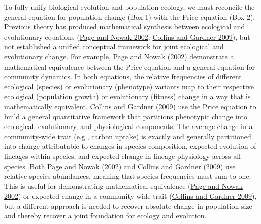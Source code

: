 \documentclass[
]{article}
\begin{document}
To fully unify biological evolution and population ecology, we must
reconcile the general equation for population change (Box 1) with the
Price equation (Box 2). Previous theory has produced mathematical
synthesis between ecological and evolutionary equations
(\protect\hyperlink{ref-Page2002}{Page and Nowak 2002};
\protect\hyperlink{ref-Collins2009}{Collins and Gardner 2009}), but not
established a unified conceptual framework for joint ecological and
evolutionary change. For example, Page and Nowak
(\protect\hyperlink{ref-Page2002}{2002}) demonstrate a mathematical
equivalence between the Price equation and a general equation for
community dynamics. In both equations, the relative frequencies of
different ecological (species) or evolutionary (phenotype) variants map
to their respective ecological (population growth) or evolutionary
(fitness) change in a way that is mathematically equivalent. Collins and
Gardner (\protect\hyperlink{ref-Collins2009}{2009}) use the Price
equation to build a general quantitative framework that partitions
phenotypic change into ecological, evolutionary, and physiological
components. The average change in a community-wide trait (e.g., carbon
uptake) is exactly and generally partitioned into change attributable to
changes in species composition, expected evolution of lineages within
species, and expected change in lineage physiology across all species.
Both Page and Nowak (\protect\hyperlink{ref-Page2002}{2002}) and Collins
and Gardner (\protect\hyperlink{ref-Collins2009}{2009}) use relative
species abundances, meaning that species frequencies must sum to one.
This is useful for demonstrating mathematical equivalence
(\protect\hyperlink{ref-Page2002}{Page and Nowak 2002}) or expected
change in a community-wide trait
(\protect\hyperlink{ref-Collins2009}{Collins and Gardner 2009}), but a
different approach is needed to recover absolute change in population
size and thereby recover a joint foundation for ecology and evolution.
\end{document}
